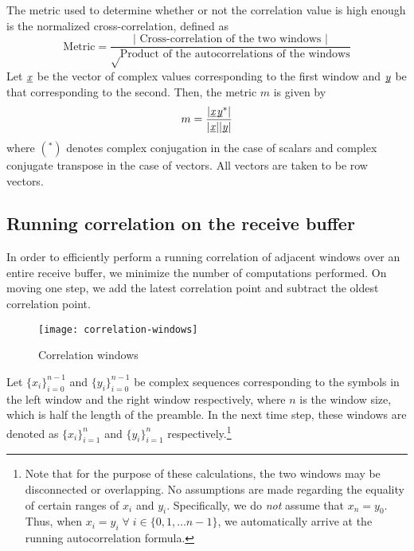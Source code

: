 The metric used to determine whether or not the correlation value is high
enough is the normalized cross-correlation, defined as
$$ \text{Metric} = \frac{|\text{ Cross-correlation of the two windows }|}
                        {\sqrt\text{Product of the autocorrelations of the
                                    windows}}
$$
Let $\underbar{\emph{x}}$ be the vector of complex values corresponding to the first window
and $\underbar{\emph{y}}$ be that corresponding to the second. Then, the metric $m$ is
given by
\begin{equation} \label{eqn:old-metric}
	m = \frac{|\corr{\ue{x}}{\ue{y}}|}{|\ue{x}||\ue{y}|}
\end{equation}
where $(^*)$ denotes complex conjugation in the case of scalars and complex
conjugate transpose in the case of vectors. All vectors are taken to be row
vectors.


\subsection{Running correlation on the receive buffer}

In order to efficiently perform a running correlation of adjacent windows over
an entire receive buffer, we minimize the number of computations performed. On
moving one step, we add the latest correlation point and subtract the oldest
correlation point.

\begin{figure}[h]
	\centering
	\texttt{[image: correlation-windows]}
	\caption{Correlation windows}
	\label{fig:corr-win}
\end{figure}

Let $\{x_i\}_{i=0}^{n-1}$ and $\{y_i\}_{i=0}^{n-1}$ be complex sequences
corresponding to the symbols in the left window and the right window
respectively, where $n$ is the window size, which is half the length of the
preamble. In the next time step, these windows are denoted as
$\{x_i\}_{i=1}^{n}$ and $\{y_i\}_{i=1}^{n}$ respectively.\footnote{Note that
for the purpose of these calculations, the two windows may be disconnected or
overlapping. No assumptions are made regarding the equality of certain ranges
of $x_i$ and $y_i$. Specifically, we do \emph{not} assume that $x_n = y_0$.
Thus, when $x_i = y_i\;\forall\;i\in\{0,1,\ldots n-1\}$, we automatically
arrive at the running autocorrelation formula.}

